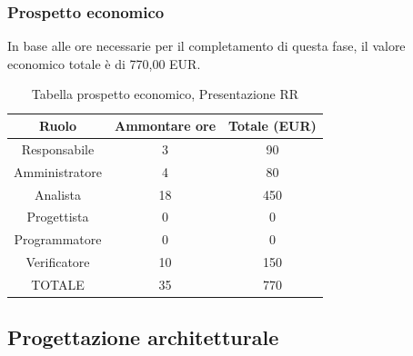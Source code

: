 \subsubsection{Prospetto economico}
In base alle ore necessarie per il completamento di questa fase, il valore economico totale è di 770,00 EUR.
\begin{table}[h]
\caption{Tabella prospetto economico, Presentazione RR}  
\begin{center}
\begin{tabular}{ |c|c|c|  }
 \hline
 Ruolo 		& Ammontare ore 	& Totale (EUR)\\
 	\hline
 \hline
 	Responsabile	& 3 		& 90\\
	Amministratore	& 4		& 80\\
	Analista		& 18 	& 450\\
	Progettista		& 0		& 0\\
	Programmatore	& 0		& 0\\
	Verificatore	& 10		& 150\\
 \hline\hline
 TOTALE		& 35		& 770\\
  \hline
\end{tabular}
\end{center}
\end{table}
\newpage
\subsection{Progettazione architetturale}
